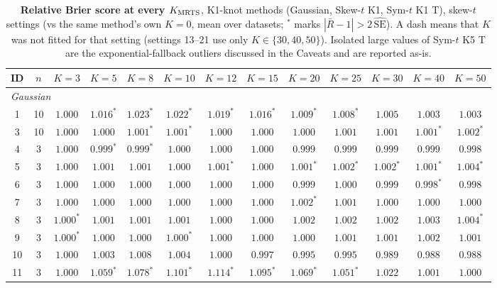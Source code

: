 \begin{table}[p]
\centering\footnotesize
\setlength{\tabcolsep}{3.5pt}
\caption{\textbf{Relative Brier score at every $K_{\mathrm{MRTS}}$}, K1-knot methods (Gaussian, Skew-$t$ K1, Sym-$t$ K1 T), skew-$t$ settings (vs the same method's own $K=0$, mean over datasets; $^{*}$ marks $|\bar R - 1| > 2\,\widehat{\mathrm{SE}}$). A dash means that $K$ was not fitted for that setting (settings 13--21 use only $K \in \{30,40,50\}$). Isolated large values of Sym-$t$ K5 T are the exponential-fallback outliers discussed in the Caveats and are reported as-is.}
\label{tab:brierK}
\begin{tabular}{ccccccccccccc}
\toprule
ID & $n$ & $K{=}3$ & $K{=}5$ & $K{=}8$ & $K{=}10$ & $K{=}12$ & $K{=}15$ & $K{=}20$ & $K{=}25$ & $K{=}30$ & $K{=}40$ & $K{=}50$ \\
\midrule
\multicolumn{13}{l}{\emph{Gaussian}} \\[1pt]
1 & 10 & $1.000$ & $1.016^{*}$ & $1.023^{*}$ & $1.022^{*}$ & $1.019^{*}$ & $1.016^{*}$ & $1.009^{*}$ & $1.008^{*}$ & $1.005$ & $1.003$ & $1.003$ \\
3 & 10 & $1.000$ & $1.000$ & $1.001^{*}$ & $1.001^{*}$ & $1.000$ & $1.000$ & $1.000$ & $1.001$ & $1.001$ & $1.001^{*}$ & $1.002^{*}$ \\
4 & 3 & $1.000$ & $0.999^{*}$ & $0.999^{*}$ & $1.000$ & $1.000$ & $1.000$ & $0.999$ & $0.999$ & $0.999$ & $0.999$ & $0.998$ \\
5 & 3 & $1.000$ & $1.001$ & $1.001$ & $1.000$ & $1.001^{*}$ & $1.000$ & $1.001^{*}$ & $1.002^{*}$ & $1.002^{*}$ & $1.001^{*}$ & $1.004^{*}$ \\
6 & 3 & $1.000$ & $1.000$ & $1.000$ & $1.000$ & $1.000$ & $1.000$ & $0.999$ & $1.000$ & $0.999$ & $0.998^{*}$ & $0.998$ \\
7 & 3 & $1.000$ & $1.000$ & $1.000$ & $1.000$ & $1.000$ & $1.000$ & $1.002^{*}$ & $1.001$ & $1.000$ & $1.000$ & $1.000$ \\
8 & 3 & $1.000^{*}$ & $1.001$ & $1.001$ & $1.001$ & $1.000$ & $1.000$ & $1.002$ & $1.002$ & $1.002$ & $1.003$ & $1.004^{*}$ \\
9 & 3 & $1.000^{*}$ & $1.000$ & $1.000$ & $1.000^{*}$ & $1.000$ & $1.000$ & $1.000$ & $1.001$ & $1.001$ & $1.002$ & $1.001$ \\
10 & 3 & $1.000$ & $1.003$ & $1.008$ & $1.004$ & $1.000$ & $0.997$ & $0.995$ & $0.995$ & $0.989$ & $0.988$ & $0.988$ \\
11 & 3 & $1.000$ & $1.059^{*}$ & $1.078^{*}$ & $1.101^{*}$ & $1.114^{*}$ & $1.095^{*}$ & $1.069^{*}$ & $1.051^{*}$ & $1.022$ & $1.001$ & $1.000$ \\

\end{tabular}
\end{table}
